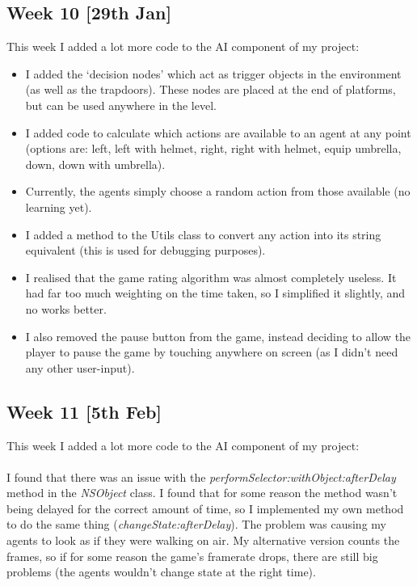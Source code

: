 \documentclass[a4paper,oneside]{report}
\begin{document}
\subsection{Week 10 [29th Jan]}

This week I added a lot more code to the AI component of my project:

\begin{itemize} 

\item I added the `decision nodes' which act as trigger objects in the environment (as well as the trapdoors). These nodes are placed at the end of platforms, but can be used anywhere in the level.

\item I added code to calculate which actions are available to an agent at any point (options are: left, left with helmet, right, right with helmet, equip umbrella, down, down with umbrella).

\item Currently, the agents simply choose a random action from those available (no learning yet).

\item I added a method to the Utils class to convert any action into its string equivalent (this is used for debugging purposes).

\item I realised that the game rating algorithm was almost completely useless. It had far too much weighting on the time taken, so I simplified it slightly, and no works better.

\item I also removed the pause button from the game, instead deciding to allow the player to pause the game by touching anywhere on screen (as I didn't need any other user-input).

\end{itemize}


\subsection{Week 11 [5th Feb]}

This week I added a lot more code to the AI component of my project:

\paragraph{} I found that there was an issue with the \emph{performSelector:withObject:afterDelay} method in the \emph{NSObject} class. I found that for some reason the method wasn't being delayed for the correct amount of time, so I implemented my own method to do the same thing (\emph{changeState:afterDelay}). The problem was causing my agents to look as if they were walking on air. My alternative version counts the frames, so if for some reason the game's framerate drops, there are still big problems (the agents wouldn't change state at the right time).
\end{document}
